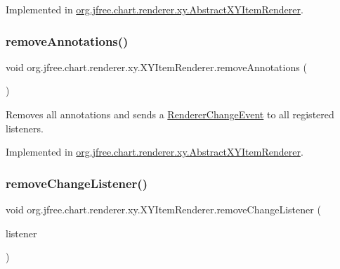 Implemented in \mbox{\hyperlink{classorg_1_1jfree_1_1chart_1_1renderer_1_1xy_1_1_abstract_x_y_item_renderer_af30d276ef041a1ee56bde0720edb0813}{org.\+jfree.\+chart.\+renderer.\+xy.\+Abstract\+X\+Y\+Item\+Renderer}}.

\mbox{\label{interfaceorg_1_1jfree_1_1chart_1_1renderer_1_1xy_1_1_x_y_item_renderer_a7144ca499540dcd5bc199cb2de85cc74}} 
\subsubsection{\texorpdfstring{remove\+Annotations()}{removeAnnotations()}}
{\footnotesize\ttfamily void org.\+jfree.\+chart.\+renderer.\+xy.\+X\+Y\+Item\+Renderer.\+remove\+Annotations (\begin{DoxyParamCaption}{ }\end{DoxyParamCaption})}

Removes all annotations and sends a \mbox{\hyperlink{}{Renderer\+Change\+Event}} to all registered listeners. 

Implemented in \mbox{\hyperlink{classorg_1_1jfree_1_1chart_1_1renderer_1_1xy_1_1_abstract_x_y_item_renderer_a2466581dbe1a0369953ed12de5efafc5}{org.\+jfree.\+chart.\+renderer.\+xy.\+Abstract\+X\+Y\+Item\+Renderer}}.

\mbox{\label{interfaceorg_1_1jfree_1_1chart_1_1renderer_1_1xy_1_1_x_y_item_renderer_a1cbda675f267deb2d47b502d5683e869}} 
\subsubsection{\texorpdfstring{remove\+Change\+Listener()}{removeChangeListener()}}
{\footnotesize\ttfamily void org.\+jfree.\+chart.\+renderer.\+xy.\+X\+Y\+Item\+Renderer.\+remove\+Change\+Listener (\begin{DoxyParamCaption}\item[{\mbox{\hyperlink{interfaceorg_1_1jfree_1_1chart_1_1event_1_1_renderer_change_listener}{Renderer\+Change\+Listener}}}]{listener }\end{DoxyParamCaption})}

